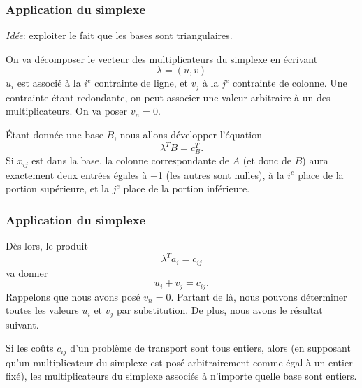 \documentclass[usepdftitle=false, aspectratio=169]{beamer}
\begin{document}
\begin{frame}
\frametitle{Application du simplexe}

{\sl Idée}: exploiter le fait que les bases sont triangulaires.

\mbox{}

On va décomposer le vecteur des multiplicateurs du simplexe en écrivant
\[
\lambda = (u,v)
\]
$u_i$ est associé à la $i^e$ contrainte de ligne, et $v_j$ à la $j^e$ contrainte de colonne. Une contrainte étant redondante, on peut associer une valeur arbitraire à un des multiplicateurs. On va poser $v_n = 0$.

\mbox{}

Étant donnée une base $B$, nous allons développer l'équation
\[
\lambda^T B = c_B^T.
\]
Si $x_{ij}$ est dans la base, la colonne correspondante de $A$ (et donc de $B$) aura exactement deux entrées égales à +1 (les autres sont nulles), à la $i^e$ place de la portion supérieure, et la $j^e$ place de la portion inférieure.

\end{frame}

\begin{frame}
\frametitle{Application du simplexe}

Dès lors, le produit
\[
\lambda^T a_i = c_{ij}
\]
va donner
\[
u_i + v_j = c_{ij}.
\]
Rappelons que nous avons posé $v_n = 0$. Partant de là, nous pouvons déterminer toutes les valeurs $u_i$ et $v_j$ par substitution. De plus, nous avons le résultat suivant.

\begin{mltheorem}
Si les coûts $c_{ij}$ d'un problème de transport sont tous entiers, alors (en supposant qu'un multiplicateur du simplexe est posé arbitrairement comme égal à un entier fixé), les multiplicateurs du simplexe associés à n'importe quelle base sont entiers.
\end{mltheorem}

\end{frame}
\end{document}
